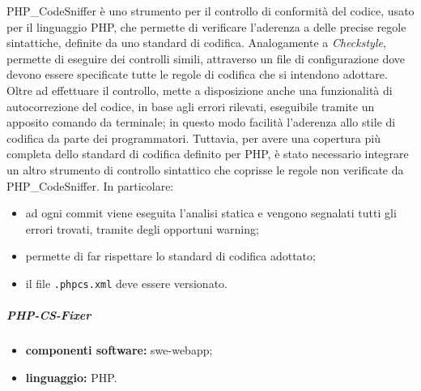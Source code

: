 					PHP\_CodeSniffer è uno strumento per il controllo di conformità del codice, usato per il linguaggio PHP, che permette di verificare l'aderenza a delle precise regole sintattiche, definite da uno standard di codifica.
					\newline
					Analogamente a \textit{Checkstyle}, permette di eseguire dei controlli simili, attraverso un file di configurazione dove devono essere specificate tutte le regole di codifica che si intendono adottare.
					\newline
					Oltre ad effettuare il controllo, mette a disposizione anche una funzionalità di autocorrezione del codice, in base agli errori rilevati, eseguibile tramite un apposito comando da terminale; in questo modo facilità l'aderenza allo stile di codifica da parte dei programmatori.
					\newline
					Tuttavia, per avere una copertura più completa dello standard di codifica definito per PHP, è stato necessario integrare un altro strumento di controllo sintattico che coprisse le regole non verificate da PHP\_CodeSniffer. In particolare:
					\begin{itemize}
						\item ad ogni commit viene eseguita l'analisi statica e vengono segnalati tutti gli errori trovati, tramite degli opportuni warning;
						\item permette di far rispettare lo standard di codifica adottato;
						\item il file \verb!.phpcs.xml! deve essere versionato.
					\end{itemize}
				
				\subparagraph{PHP-CS-Fixer} 
					
					\begin{itemize}
						\item \textbf{componenti software:} swe-webapp;
						\item \textbf{linguaggio:} PHP.
					\end{itemize}
					
